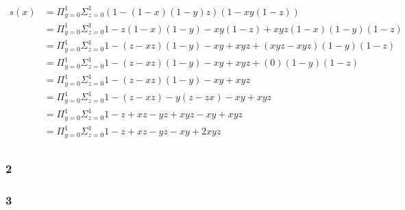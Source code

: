 \documentclass[letterpaper,notitlepage,twoside]{article}
\begin{document}
\begin{align*}
s(x) &= \Pi_{y = 0}^1\Sigma_{z = 0}^1 (1 - (1 - x)(1 - y)z)(1 - xy(1 - z)) \\
     &= \Pi_{y = 0}^1\Sigma_{z = 0}^1 1 - z(1 - x)(1 - y) - xy(1 - z) + xyz(1 - x)(1 - y)(1 - z) \\
     &= \Pi_{y = 0}^1\Sigma_{z = 0}^1 1 - (z - xz)(1 - y) - xy + xyz + (xyz - xyz)(1 - y)(1 - z) \\
     &= \Pi_{y = 0}^1\Sigma_{z = 0}^1 1 - (z - xz)(1 - y) - xy + xyz + (0)(1 - y)(1 - z) \\
     &= \Pi_{y = 0}^1\Sigma_{z = 0}^1 1 - (z - xz)(1 - y) - xy + xyz \\
     &= \Pi_{y = 0}^1\Sigma_{z = 0}^1 1 - (z - xz) - y(z - zx) - xy + xyz \\
     &= \Pi_{y = 0}^1\Sigma_{z = 0}^1 1 - z + xz - yz + xyz - xy + xyz \\
     &= \Pi_{y = 0}^1\Sigma_{z = 0}^1 1 - z + xz - yz - xy + 2xyz \\
\end{align*}

\subsubsection*{2}
\subsubsection*{3}
\end{document}
